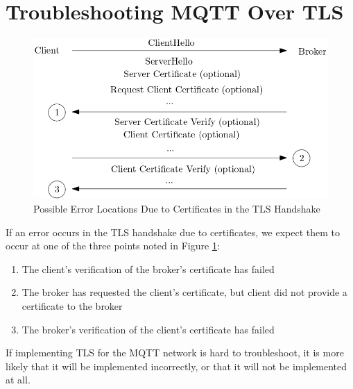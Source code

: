 \documentclass[12pt]{article}
\begin{document}
\section{Troubleshooting MQTT Over TLS}
\begin{figure}[!htb]
\centering
	\includegraphics[scale=0.5]{tls-handshake.png}
	\caption{Possible Error Locations Due to Certificates in the TLS Handshake\label{fig:handshake}}
\end{figure}
If an error occurs in the TLS handshake due to certificates, we expect them to occur at one of the three points noted in Figure \ref{fig:handshake}:
\begin{enumerate}
	\item The client's verification of the broker's certificate has failed
	\item The broker has requested the client's certificate, but client did not provide a certificate to the broker
	\item The broker's verification of the client's certificate has failed
\end{enumerate}

If implementing TLS for the MQTT network is hard to troubleshoot, it is more likely that it will be implemented incorrectly, or that it will not be implemented at all. 
\end{document}
